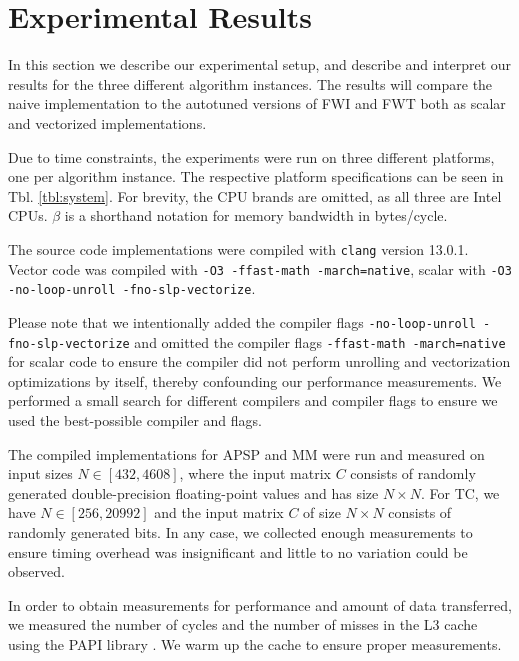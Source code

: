 \section{Experimental Results}\label{sec:exp}

In this section we describe our experimental setup, and describe and interpret our results for the three different algorithm instances.
The results will compare the naive implementation to the autotuned versions of FWI and FWT both as scalar and vectorized implementations. 

Due to time constraints, the experiments were run on three different platforms, one per algorithm instance. The respective platform specifications can be seen in Tbl. \ref{tbl:system}. For brevity, the CPU brands are omitted, as all three are Intel CPUs. $\beta$ is a shorthand notation for memory bandwidth in bytes/cycle. 

The source code implementations were compiled with \texttt{clang} version 13.0.1. Vector code was compiled with \texttt{-O3 -ffast-math -march=native}, scalar with \texttt{-O3 -no-loop-unroll -fno-slp-vectorize}. 

Please note that we intentionally added the compiler flags \texttt{-no-loop-unroll -fno-slp-vectorize} and omitted the compiler flags \texttt{-ffast-math -march=native} for scalar code to ensure the compiler did not perform unrolling and vectorization optimizations by itself, thereby confounding our performance measurements. We performed a small search for different compilers and compiler flags to ensure we used the best-possible compiler and flags.

The compiled implementations for APSP and MM were run and measured on input sizes $N \in [432, 4608]$, where the input matrix $C$ consists of randomly generated double-precision floating-point values and has size $N \times N$. For TC, we have $N \in [256, 20992]$ and the input matrix $C$ of size $N \times N$ consists of randomly generated bits. In any case, we collected enough measurements to ensure timing overhead was insignificant and little to no variation could be observed.

In order to obtain measurements for performance and amount of data transferred, we measured the number of cycles and the number of misses in the L3 cache using the PAPI library \cite{terpstra2010papi}. We warm up the cache to ensure proper measurements.

